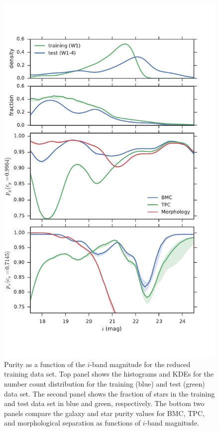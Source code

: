\begin{figure}[htp]
  \centering
  \includegraphics[width=0.7\linewidth]{figures/purity_mag_cut.pdf}
  \caption{Purity as a function of the $i$-band magnitude
           for the reduced training data set.
           Top panel shows the histograms and KDEs
           for the number count distribution for
           the training (blue) and test (green) data set.
           The second panel shows the fraction of stars
           in the training and test data set in blue and green, respectively.
           The bottom two panels compare
           the galaxy and star purity values for BMC, TPC, 
           and morphological separation as functions of $i$-band magnitude.}
  \label{fig:purity_mag_cut}
\end{figure}


